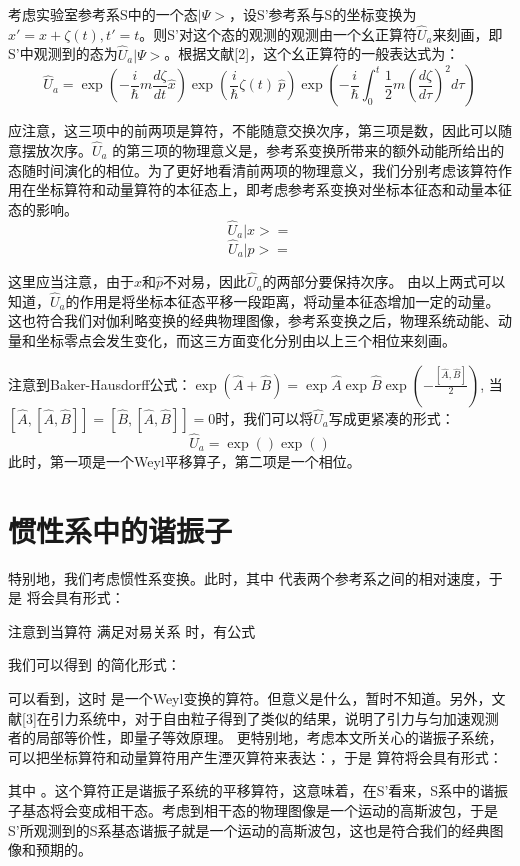 \documentclass[a4paper]{article}
\begin{document}
        考虑实验室参考系S中的一个态$|\Psi>$，设S’参考系与S的坐标变换为$x'=x+\zeta(t), t'=t$。则S’对这个态的观测的观测由一个幺正算符$\hat{U}_a$来刻画，即S’中观测到的态为$\hat{U}_a|\Psi>$。根据文献[2]，这个幺正算符的一般表达式为：
        \begin{equation}
            \hat{U}_a=\exp(-\frac{i}{\hbar} m \frac{d \zeta}{dt} \hat{x}) \exp({\frac{i}{\hbar}\zeta(t)\ \hat{p}}) \exp(-\frac{i}{\hbar}\int_0^t\frac{1}{2}m(\frac{d \zeta}{d\tau})^2 d\tau)
        \end{equation}
        
        应注意，这三项中的前两项是算符，不能随意交换次序，第三项是数，因此可以随意摆放次序。$\hat{U}_a$ 的第三项的物理意义是，参考系变换所带来的额外动能所给出的态随时间演化的相位。为了更好地看清前两项的物理意义，我们分别考虑该算符作用在坐标算符和动量算符的本征态上，即考虑参考系变换对坐标本征态和动量本征态的影响。
        \begin{equation}
            \hat{U}_a |x> =
        \end{equation}
        \begin{equation}
            \hat{U}_a |p> = 
        \end{equation}

        这里应当注意，由于$\hat{x}$和$\hat{p}$不对易，因此$\hat{U}_a$的两部分要保持次序。
        由以上两式可以知道，$\hat{U}_a$的作用是将坐标本征态平移一段距离，将动量本征态增加一定的动量。这也符合我们对伽利略变换的经典物理图像，参考系变换之后，物理系统动能、动量和坐标零点会发生变化，而这三方面变化分别由以上三个相位来刻画。

        注意到Baker-Hausdorff公式：$\exp(\hat{A}+\hat{B})=\exp\hat{A} \exp\hat{B} \exp(-\frac{[\hat{A}, \hat{B}]}{2})$, 当$[\hat{A}, [\hat{A}, \hat{B}]]=[\hat{B}, [\hat{A}, \hat{B}]]=0$时，我们可以将$\hat{U}_a$写成更紧凑的形式：
        \begin{equation}
            \hat{U}_a=\exp() \exp()
        \end{equation}
        此时，第一项是一个Weyl平移算子，第二项是一个相位。
        

    \section{惯性系中的谐振子}
        特别地，我们考虑惯性系变换。此时，其中 代表两个参考系之间的相对速度，于是 将会具有形式：
        
        注意到当算符 满足对易关系 时，有公式
        
        我们可以得到 的简化形式：
        
        可以看到，这时 是一个Weyl变换的算符。但意义是什么，暂时不知道。另外，文献[3]在引力系统中，对于自由粒子得到了类似的结果，说明了引力与匀加速观测者的局部等价性，即量子等效原理。
        更特别地，考虑本文所关心的谐振子系统，可以把坐标算符和动量算符用产生湮灭算符来表达：，于是 算符将会具有形式：
        
        其中 。这个算符正是谐振子系统的平移算符，这意味着，在S’看来，S系中的谐振子基态将会变成相干态。考虑到相干态的物理图像是一个运动的高斯波包，于是S’所观测到的S系基态谐振子就是一个运动的高斯波包，这也是符合我们的经典图像和预期的。
    
\end{document}
